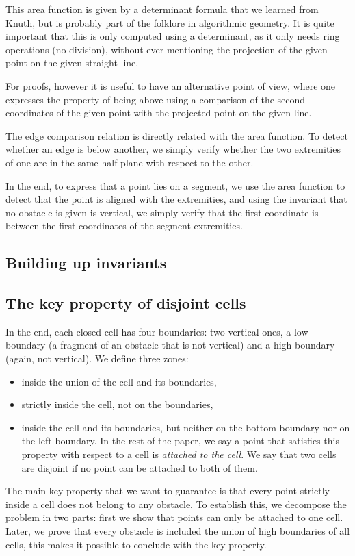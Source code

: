 \documentclass[a4paper, USenglish, cleveref, autoref, thm-restate]{lipics-v2021}
\begin{document}
This area function is given by a determinant formula that we learned
from Knuth, but is probably part of the folklore in algorithmic
geometry.  It is quite important that this is only computed using a
determinant, as it only needs ring operations (no division), without
ever mentioning the projection of the given point on the given
straight line.

For proofs, however it is useful to have an alternative point of view,
where one expresses the property of being above using a comparison of
the second coordinates of the given point with the projected point on
the given line.

The edge comparison relation is directly related with the area
function.  To detect whether an edge is below another, we simply
verify whether the two extremities of one are in the same half plane
with respect to the other.

In the end, to express that a point lies on a segment, we use the area
function to detect that the point is aligned with the extremities, and
using the invariant that no obstacle is given is vertical, we simply
verify that the first coordinate is between the first coordinates of
the segment extremities.
\subsection{Building up invariants}
\subsection{The key property of disjoint cells}
In the end, each closed cell has four boundaries: two vertical ones, a
low boundary (a fragment of an obstacle that is not vertical) and a
high boundary (again, not vertical).  We define three zones:
\begin{itemize}
\item inside the union of the cell and its boundaries,
\item strictly inside the cell, not on the boundaries,
\item inside the cell and its
 boundaries, but neither on the bottom boundary nor on the left
 boundary.  In the rest of the paper, we say a point that satisfies
 this property with respect to a cell is {\em attached to the cell}.
 We say that two cells are disjoint if no point can be attached to
 both of them.
\end{itemize}
The main key property that we want to guarantee is that every point
strictly inside a cell does not belong to any obstacle.  To establish
this, we decompose the problem in two parts: first we show
that points can only be attached to one cell.  Later, we
prove that every obstacle is included the union of high boundaries of
all cells, this makes it possible to conclude with the key property.
\end{document}
